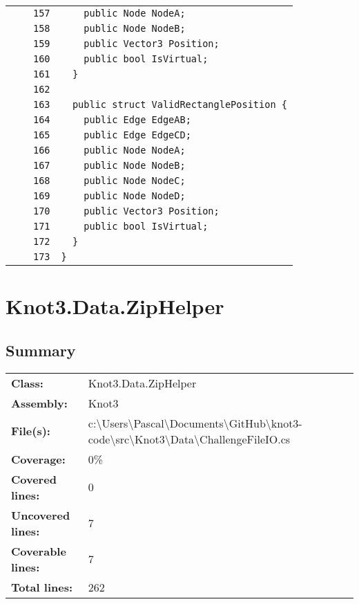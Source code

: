 \documentclass[a4paper,10pt]{article}
\begin{document}
\begin{longtable}[l]{lrrl}
\cellcolor{gray} &  & \verb~157~ & \verb~    public Node NodeA;~\\
\cellcolor{gray} &  & \verb~158~ & \verb~    public Node NodeB;~\\
\cellcolor{gray} &  & \verb~159~ & \verb~    public Vector3 Position;~\\
\cellcolor{gray} &  & \verb~160~ & \verb~    public bool IsVirtual;~\\
\cellcolor{gray} &  & \verb~161~ & \verb~  }~\\
\cellcolor{gray} &  & \verb~162~ & \verb~~\\
\cellcolor{gray} &  & \verb~163~ & \verb~  public struct ValidRectanglePosition {~\\
\cellcolor{gray} &  & \verb~164~ & \verb~    public Edge EdgeAB;~\\
\cellcolor{gray} &  & \verb~165~ & \verb~    public Edge EdgeCD;~\\
\cellcolor{gray} &  & \verb~166~ & \verb~    public Node NodeA;~\\
\cellcolor{gray} &  & \verb~167~ & \verb~    public Node NodeB;~\\
\cellcolor{gray} &  & \verb~168~ & \verb~    public Node NodeC;~\\
\cellcolor{gray} &  & \verb~169~ & \verb~    public Node NodeD;~\\
\cellcolor{gray} &  & \verb~170~ & \verb~    public Vector3 Position;~\\
\cellcolor{gray} &  & \verb~171~ & \verb~    public bool IsVirtual;~\\
\cellcolor{gray} &  & \verb~172~ & \verb~  }~\\
\cellcolor{gray} &  & \verb~173~ & \verb~}~\\
\end{longtable}
\newpage
\section{Knot3.Data.ZipHelper}
\subsection{Summary}
\begin{longtable}[l]{ll}
\textbf{Class:} & Knot3.Data.ZipHelper\\
\textbf{Assembly:} & Knot3\\
\textbf{File(s):} & \begin{minipage}[t]{12cm}{c:\textbackslash Users\textbackslash Pascal\textbackslash Documents\textbackslash GitHub\textbackslash knot3-code\textbackslash src\textbackslash Knot3\textbackslash Data\textbackslash ChallengeFileIO.cs}\end{minipage} \\
\textbf{Coverage:} & 0\%\\
\textbf{Covered lines:} & 0\\
\textbf{Uncovered lines:} & 7\\
\textbf{Coverable lines:} & 7\\
\textbf{Total lines:} & 262\\
\end{longtable}
\end{document}

